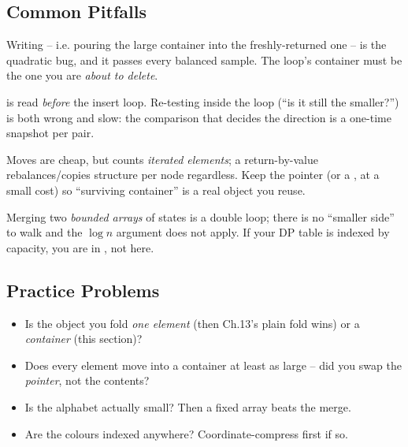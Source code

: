 \subsection{Common Pitfalls}

\begin{warningbox}
Writing  -- i.e. pouring the
large container into the freshly-returned one -- is the quadratic bug, and it
passes every balanced sample.  The loop's container must be the one you are
\emph{about to delete}.
\end{warningbox}

\begin{warningbox}
 is read \emph{before} the insert loop.  Re-testing inside
the loop (``is it still the smaller?'') is both wrong and slow: the comparison
that decides the direction is a one-time snapshot per pair.
\end{warningbox}

\begin{warningbox}
Moves are cheap, but  counts \emph{iterated elements}; a
 return-by-value rebalances/copies structure per node regardless.
Keep the pointer (or a , at a small cost) so ``surviving
container'' is a real object you reuse.
\end{warningbox}

\begin{warningbox}
Merging two \emph{bounded arrays} of states is a double loop; there is no
``smaller side'' to walk and the \(\log n\) argument does not apply.  If your
DP table is indexed by capacity, you are in , not here.
\end{warningbox}

\subsection{Practice Problems}

\begin{stuckbox}
\begin{itemize}[nosep,leftmargin=1.4em]
  \item Is the object you fold \emph{one element} (then Ch.13's plain fold wins)
        or a \emph{container} (this section)?
  \item Does every element move into a container at least as large -- did you
        swap the \emph{pointer}, not the contents?
  \item Is the alphabet actually small? Then a fixed array beats the merge.
  \item Are the colours indexed anywhere? Coordinate-compress first if so.
\end{itemize}
\end{stuckbox}

